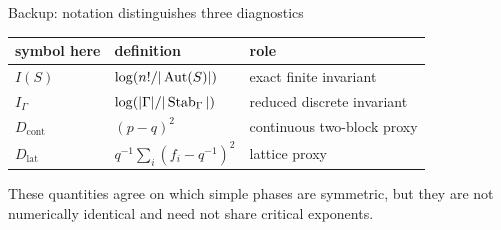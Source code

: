 \begin{frame}{Backup: notation distinguishes three diagnostics}
  \centering
  \begin{tabular}{lll}
    \toprule
    symbol here & definition & role \\
    \midrule
    $I(S)$ & $\log(n!/|\operatorname{Aut}(S)|)$ & exact finite invariant \\
    $I_\Gamma$ & $\log(|\Gamma|/|\operatorname{Stab}_\Gamma|)$ & reduced discrete invariant \\
    $D_{\mathrm{cont}}$ & $(p-q)^2$ & continuous two-block proxy \\
    $D_{\mathrm{lat}}$ & $q^{-1}\sum_i(f_i-q^{-1})^2$ & lattice proxy \\
    \bottomrule
  \end{tabular}

  \vspace{0.8em}
  These quantities agree on which simple phases are symmetric, but they are not
  numerically identical and need not share critical exponents.
\end{frame}
